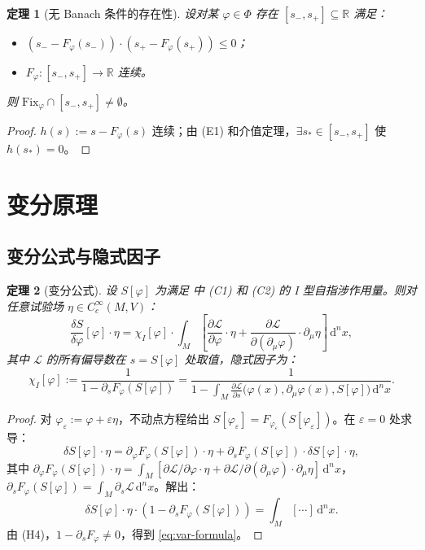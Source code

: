 \documentclass[12pt,a4paper]{article}
\newtheorem{theorem}{定理}[section]
\theoremstyle{definition}
\newcommand{\mL}{\mathcal{L}}
\newcommand{\mPhi}{\Phi}
\newcommand{\Fix}{\mathrm{Fix}}
\newcommand{\R}{\mathbb{R}}
\newcommand{\diff}{\mathrm{d}}
\newcommand{\eps}{\varepsilon}
\newcommand{\dVol}{\,\diff^n x}
\begin{document}
\begin{theorem}[无 Banach 条件的存在性]
\label{thm:p2}
设对某 $\varphi \in \mPhi$ 存在 $[s_-, s_+] \subseteq \R$ 满足：
\begin{itemize}
\item[(E1)] $(s_- - F_\varphi(s_-)) \cdot (s_+ - F_\varphi(s_+)) \leq 0$；
\item[(E2)] $F_\varphi: [s_-, s_+] \to \R$ 连续。
\end{itemize}
则 $\Fix_\varphi \cap [s_-, s_+] \neq \emptyset$。
\end{theorem}

\begin{proof}
$h(s) := s - F_\varphi(s)$ 连续；由 (E1) 和介值定理，$\exists s_* \in [s_-, s_+]$ 使 $h(s_*) = 0$。
\end{proof}

\section{变分原理}
\label{sec:variational}

\subsection{变分公式与隐式因子}

\begin{theorem}[变分公式]
\label{thm:var-formula}
设 $S[\varphi]$ 为满足 中 (C1) 和 (C2) 的 I 型自指涉作用量。则对任意试验场 $\eta \in C_c^\infty(M, V)$：
\begin{equation}
\frac{\delta S}{\delta \varphi}[\varphi] \cdot \eta = \chi_I[\varphi] \cdot \int_M \left[\frac{\partial \mL}{\partial \varphi} \cdot \eta + \frac{\partial \mL}{\partial(\partial_\mu \varphi)} \cdot \partial_\mu \eta\right] \dVol,
\label{eq:var-formula}
\end{equation}
其中 $\mL$ 的所有偏导数在 $s = S[\varphi]$ 处取值，\emph{隐式因子}为：
\begin{equation}
\chi_I[\varphi] := \frac{1}{1 - \partial_s F_\varphi(S[\varphi])} = \frac{1}{1 - \int_M \frac{\partial \mL}{\partial s}\bigl(\varphi(x), \partial_\mu\varphi(x), S[\varphi]\bigr) \dVol}.
\label{eq:implicit-factor}
\end{equation}
\end{theorem}

\begin{proof}
对 $\varphi_\eps := \varphi + \eps\eta$，不动点方程给出 $S[\varphi_\eps] = F_{\varphi_\eps}(S[\varphi_\eps])$。在 $\eps = 0$ 处求导：
\[ \delta S[\varphi] \cdot \eta = \partial_\varphi F_\varphi(S[\varphi]) \cdot \eta + \partial_s F_\varphi(S[\varphi]) \cdot \delta S[\varphi] \cdot \eta, \]
其中 $\partial_\varphi F_\varphi(S[\varphi]) \cdot \eta = \int_M [\partial\mL/\partial\varphi \cdot \eta + \partial\mL/\partial(\partial_\mu\varphi) \cdot \partial_\mu\eta] \dVol$，$\partial_s F_\varphi(S[\varphi]) = \int_M \partial_s \mL \dVol$。解出：
\[ \delta S[\varphi] \cdot \eta \cdot (1 - \partial_s F_\varphi(S[\varphi])) = \int_M [\cdots] \dVol. \]
由 (H4)，$1 - \partial_s F_\varphi \neq 0$，得到 \eqref{eq:var-formula}。
\end{proof}
\end{document}
